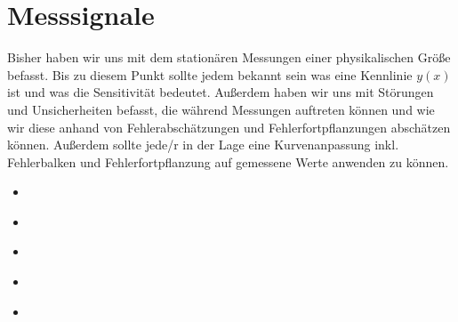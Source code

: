 \documentclass[letterpaper,10pt,english]{jupyterBook}
\begin{document}
\sphinxstepscope


\chapter{Messsignale}
\label{\detokenize{content/3_Messsignale:messsignale}}\label{\detokenize{content/3_Messsignale::doc}}
\sphinxAtStartPar
Bisher haben wir uns mit dem stationären Messungen einer physikalischen Größe befasst. Bis zu diesem Punkt sollte jedem bekannt sein was eine Kennlinie \(y(x)\) ist und was die Sensitivität bedeutet. Außerdem haben wir uns mit Störungen und Unsicherheiten befasst, die während Messungen auftreten können und wie wir diese anhand von Fehlerabschätzungen und Fehlerfortpflanzungen abschätzen können. Außerdem sollte jede/r in der Lage eine Kurvenanpassung inkl. Fehlerbalken und Fehlerfortpflanzung auf gemessene Werte anwenden zu können.
\begin{itemize}
\item {} 
\sphinxAtStartPar
{\hyperref[\detokenize{content/3_basics::doc}]{}}

\item {} 
\sphinxAtStartPar
{\hyperref[\detokenize{content/3_Kenngroessen::doc}]{}}

\item {} 
\sphinxAtStartPar
{\hyperref[\detokenize{content/3_Modulationen::doc}]{}}

\item {} 
\sphinxAtStartPar
{\hyperref[\detokenize{content/3_FourierAnalyse::doc}]{}}

\item {} 
\sphinxAtStartPar
{\hyperref[\detokenize{content/3_Rauschen::doc}]{}}

\end{itemize}

\sphinxstepscope
\end{document}

